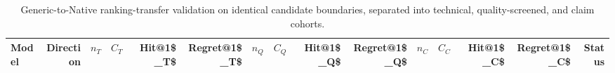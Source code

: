 \begin{table}[t]
\centering
\small
\caption{Generic-to-Native ranking-transfer validation on identical candidate boundaries, separated into technical, quality-screened, and claim cohorts.}
\label{tab:cross-runner-ranking-transfer}
\begin{tabular}{lrrrrrrrrrrrrrr}
\toprule
Model & Direction & $n_T$ & $C_T$ & Hit@1\$\_T\$ & Regret@1\$\_T\$ & $n_Q$ & $C_Q$ & Hit@1\$\_Q\$ & Regret@1\$\_Q\$ & $n_C$ & $C_C$ & Hit@1\$\_C\$ & Regret@1\$\_C\$ & Status \\
\midrule
\bottomrule
\end{tabular}
\end{table}
